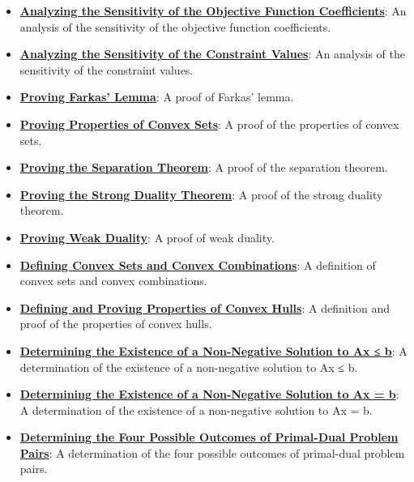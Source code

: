 \documentclass{article}%
\begin{document}
\begin{itemize}[leftmargin=*]
\item \href{https://www.math.purdue.edu/~yipn/421/2024-12-03-Duality.pdf#page=1}{\textbf{Analyzing the Sensitivity of the Objective Function Coefficients}}: An analysis of the sensitivity of the objective function coefficients. %
\item \href{https://www.math.purdue.edu/~yipn/421/2024-12-03-Duality.pdf#page=1}{\textbf{Analyzing the Sensitivity of the Constraint Values}}: An analysis of the sensitivity of the constraint values. %
\item \href{https://www.math.purdue.edu/~yipn/421/2024-12-03-Duality.pdf#page=1}{\textbf{Proving Farkas' Lemma}}: A proof of Farkas' lemma. %
\item \href{https://www.math.purdue.edu/~yipn/421/2024-12-03-Duality.pdf#page=1}{\textbf{Proving Properties of Convex Sets}}: A proof of the properties of convex sets. %
\item \href{https://www.math.purdue.edu/~yipn/421/2024-12-03-Duality.pdf#page=1}{\textbf{Proving the Separation Theorem}}: A proof of the separation theorem. %
\item \href{https://www.math.purdue.edu/~yipn/421/2024-12-03-Duality.pdf#page=1}{\textbf{Proving the Strong Duality Theorem}}: A proof of the strong duality theorem. %
\item \href{https://www.math.purdue.edu/~yipn/421/2024-12-03-Duality.pdf#page=1}{\textbf{Proving Weak Duality}}: A proof of weak duality. %
\item \href{https://www.math.purdue.edu/~yipn/421/2024-12-03-Duality.pdf#page=1}{\textbf{Defining Convex Sets and Convex Combinations}}: A definition of convex sets and convex combinations. %
\item \href{https://www.math.purdue.edu/~yipn/421/2024-12-03-Duality.pdf#page=1}{\textbf{Defining and Proving Properties of Convex Hulls}}: A definition and proof of the properties of convex hulls. %
\item \href{https://www.math.purdue.edu/~yipn/421/2024-12-03-Duality.pdf#page=1}{\textbf{Determining the Existence of a Non{-}Negative Solution to Ax ≤ b}}: A determination of the existence of a non-negative solution to Ax ≤ b. %
\item \href{https://www.math.purdue.edu/~yipn/421/2024-12-03-Duality.pdf#page=1}{\textbf{Determining the Existence of a Non{-}Negative Solution to Ax = b}}: A determination of the existence of a non-negative solution to Ax = b. %
\item \href{https://www.math.purdue.edu/~yipn/421/2024-12-03-Duality.pdf#page=1}{\textbf{Determining the Four Possible Outcomes of Primal{-}Dual Problem Pairs}}: A determination of the four possible outcomes of primal-dual problem pairs. %

\end{itemize}
\end{document}
